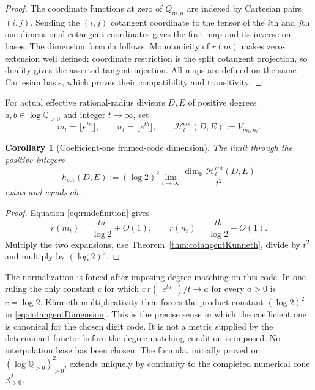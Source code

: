 \documentclass[11pt]{amsart}
\newtheorem{corollary}[theorem]{Corollary}
\theoremstyle{definition}
\theoremstyle{remark}
\newcommand{\R}{\mathbb R}
\newcommand{\Q}{\mathbb Q}
\begin{document}
\begin{proof}
The coordinate functions at zero of $Q_{m,n}$ are indexed by Cartesian
pairs $(i,j)$.  Sending the $(i,j)$ cotangent coordinate to the tensor of the
$i$th and $j$th one-dimensional cotangent coordinates gives the first map and its
inverse on bases.  The dimension formula follows.  Monotonicity of
$r(m)$ makes zero-extension well defined; coordinate restriction is the
split cotangent projection, so duality gives the asserted tangent
injection.  All maps are defined on the same Cartesian basis, which proves
their compatibility and transitivity.
\end{proof}

For actual effective rational-radius divisors $D,E$ of positive degrees
$a,b\in\log\Q_{>0}$ and integer $t\to\infty$, set
\begin{equation}\label{eq:scaledCode}
 m_t=\lfloor e^{ta}\rfloor,\qquad n_t=\lfloor e^{tb}\rfloor,\qquad
 \mathcal H_t^{\mathrm{cot}}(D,E):=V_{m_t,n_t}.
\end{equation}

\begin{corollary}[Coefficient-one framed-code dimension]
\label{cor:cotangentRRdimension}
The limit through the positive integers
\begin{equation}\label{eq:cotangentDimension}
 h_{\mathrm{cot}}(D,E):=(\log2)^2
 \lim_{t\to\infty}\frac{\dim_{\R}\mathcal H_t^{\mathrm{cot}}(D,E)}{t^2}
\end{equation}
exists and equals $ab$.
\end{corollary}

\begin{proof}
Equation \eqref{eq:rmdefinition} gives
\[
 r(m_t)=\frac{ta}{\log2}+O(1),\qquad
 r(n_t)=\frac{tb}{\log2}+O(1).
\]
Multiply the two expansions, use Theorem~\ref{thm:cotangentKunneth}, divide
by $t^2$ and multiply by $(\log2)^2$.
\end{proof}

The normalization is forced after imposing degree matching on this code.
In one ruling the only constant
$c$ for which $c\,r(\lfloor e^{ta}\rfloor)/t\to a$ for every $a>0$ is
$c=\log2$.  K\"unneth multiplicativity then forces the product constant
$(\log2)^2$ in \eqref{eq:cotangentDimension}.  This is the precise sense in
which the coefficient one is canonical for the chosen digit code.  It is
not a metric supplied by the determinant functor before the degree-matching
condition is imposed.  No interpolation base has been chosen.  The formula,
initially proved on $(\log\Q_{>0})_{>0}^2$, extends uniquely by continuity to
the completed numerical cone $\R_{>0}^2$.
\end{document}
